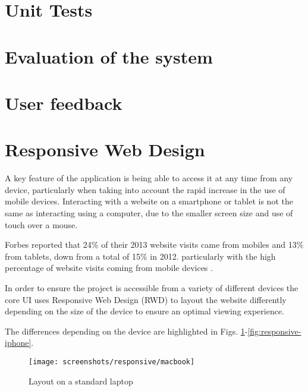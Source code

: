 \section{Unit Tests}

\section{Evaluation of the system}


\section{User feedback}


\section[Responsive Design]{Responsive Web Design}

A key feature of the application is being able to access it at any time from any device, particularly when taking into account the rapid increase in the use of mobile devices.  Interacting with a website on a smartphone or tablet is not the same as interacting using a computer, due to the smaller screen size and use of touch over a mouse.

Forbes reported that 24\% of their 2013 website visits came from mobiles and 13\% from tablets, down from a total of 15\% in 2012. particularly with the high percentage of website visits coming from mobile devices \parencite{steimle2013responsive}.

In order to ensure the project is accessible from a variety of different devices the core UI uses Responsive Web Design (RWD) to layout the website differently depending on the size of the device to ensure an optimal viewing experience.

The differences depending on the device are highlighted in Figs. \ref{fig:responsive-macbook}-\ref{fig:responsive-iphone}.

\begin{figure}[h]
    \centering
    \texttt{[image: screenshots/responsive/macbook]}
    \caption{Layout on a standard laptop}
    \label{fig:responsive-macbook}
\end{figure}

